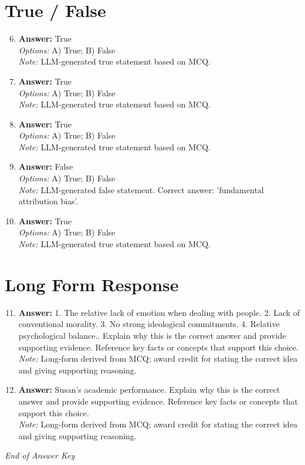 \documentclass[12pt]{article}
\begin{document}
\section*{True / False}
\begin{enumerate}[label=\arabic*.]
\setcounter{enumi}{5}
\item \textbf{Answer:} True
\\ \textit{Options:} A) True; B) False
\\ \textit{Note:} LLM-generated true statement based on MCQ.
\item \textbf{Answer:} True
\\ \textit{Options:} A) True; B) False
\\ \textit{Note:} LLM-generated true statement based on MCQ.
\item \textbf{Answer:} True
\\ \textit{Options:} A) True; B) False
\\ \textit{Note:} LLM-generated true statement based on MCQ.
\item \textbf{Answer:} False
\\ \textit{Options:} A) True; B) False
\\ \textit{Note:} LLM-generated false statement. Correct answer: 'fundamental attribution bias'.
\item \textbf{Answer:} True
\\ \textit{Options:} A) True; B) False
\\ \textit{Note:} LLM-generated true statement based on MCQ.
\end{enumerate}

\section*{Long Form Response}
\begin{enumerate}[label=\arabic*.]
\setcounter{enumi}{10}
\item \textbf{Answer:} 1. The relative lack of emotion when dealing with people. 2. Lack of conventional morality. 3. No strong ideological commitments. 4. Relative psychological balance.. Explain why this is the correct answer and provide supporting evidence. Reference key facts or concepts that support this choice.
\\ \textit{Note:} Long-form derived from MCQ; award credit for stating the correct idea and giving supporting reasoning.
\item \textbf{Answer:} Susan's academic performance. Explain why this is the correct answer and provide supporting evidence. Reference key facts or concepts that support this choice.
\\ \textit{Note:} Long-form derived from MCQ; award credit for stating the correct idea and giving supporting reasoning.
\end{enumerate}

\vfill
\noindent\textit{End of Answer Key}
\end{document}
